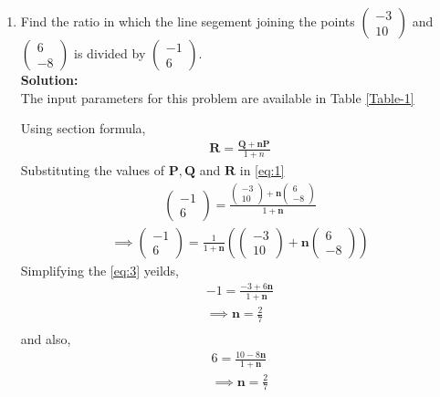 \documentclass[12pt]{article}
\providecommand{\brak}[1]{\ensuremath{\left(#1\right)}}
\newcommand{\solution}{\noindent \textbf{Solution: }}
\newcommand{\myvec}[1]{\ensuremath{\begin{pmatrix}#1\end{pmatrix}}}
\let\vec\mathbf
\begin{document}
\begin{enumerate}

\item Find the ratio in which the line segement joining the points $\myvec{-3 \\ 10}$ and $\myvec{6\\-8}$ is divided by $\myvec{-1\\6}$.\\

\solution \\The input parameters for this problem are available in Table \eqref{Table-1}
\begin{table}[ht!]

\caption{}
\label{Table-1}	
\end{table}

Using section formula,
\begin{align}
	 \vec{R}=\frac{\vec{Q}+\vec{n}\vec{P}}{1+n}\label{eq:1}
\end{align}
Substituting the values of $\vec{P},\vec{Q}$ and $\vec{R}$ in \eqref{eq:1}
\begin{align}
	 \myvec{-1\\6}=\frac{{\myvec{-3\\10}+\vec{n}\myvec{6\\-8}}}{1+\vec{n}}
\end{align}
\begin{align}
	 \implies \myvec{-1\\6}=\frac{1}{1+\vec{n}}\brak{{\myvec{-3\\10}+\vec{n}\myvec{6\\-8}}} \label{eq:3}
\end{align}
Simplifying the \eqref{eq:3} yeilds,
\begin{multline}
	  -1=\frac{-3+6\vec{n}}{1+\vec{n}}\\
	 \implies \vec{n}=\frac{2}{7}\\
\end{multline}
and also,
\begin{multline}
	 6=\frac{10-8\vec{n}}{1+\vec{n}}\\
	  \implies \vec{n}=\frac{2}{7}\\
\end{multline}



\end{enumerate}
\end{document}
